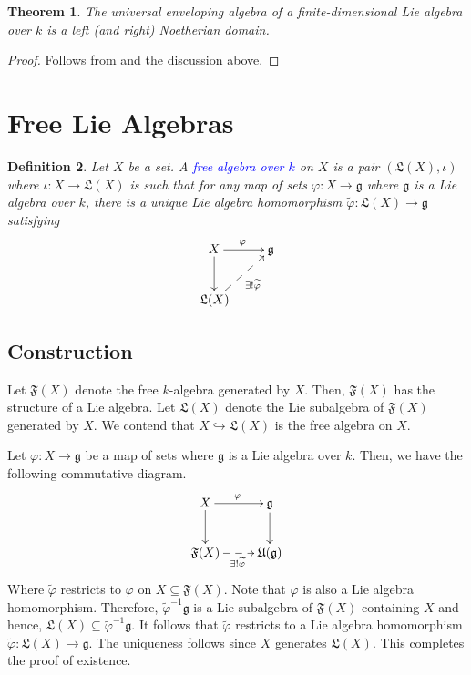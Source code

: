 \documentclass[12pt]{article}
\theoremstyle{thmstyle}
\newtheorem{theorem}{Theorem}[section]
\theoremstyle{defstyle}
\newtheorem{definition}[theorem]{Definition}
\newcommand{\frakF}{\mathfrak{F}}
\newcommand{\frakg}{\mathfrak{g}}
\newcommand{\frakL}{\mathfrak{L}}
\newcommand{\frakU}{\mathfrak{U}}
\newcommand{\wt}[1]{\widetilde{#1}}
\newcommand{\into}{\hookrightarrow}
\newcommand{\define}[1]{\textcolor{blue}{\textit{#1}}}
\begin{document}
\begin{theorem}
    The universal enveloping algebra of a finite-dimensional Lie algebra over $k$ is a left (and right) Noetherian domain.
\end{theorem}
\begin{proof}
    Follows from  and the discussion above.
\end{proof}

\section{Free Lie Algebras}

\begin{definition}
    Let $X$ be a set. A \define{free algebra over $k$} on $X$ is a pair $(\frakL(X), \iota)$ where $\iota: X\to\frakL(X)$ is such that for any map of sets $\varphi: X\to\frakg$ where $\frakg$ is a Lie algebra over $k$, there is a unique Lie algebra homomorphism $\wt\varphi:\frakL(X)\to\frakg$ satisfying 
    \begin{equation*}
        \xymatrix {
            X\ar[r]^{\varphi}\ar[d] & \frakg\\
            \frakL(X)\ar@{-->}[ru]_{\exists!\wt\varphi}
        }
    \end{equation*}
\end{definition}

\subsection{Construction}

Let $\mathfrak F(X)$ denote the free $k$-algebra generated by $X$. Then, $\frakF(X)$ has the structure of a Lie algebra. Let $\frakL(X)$ denote the Lie subalgebra of $\frakF(X)$ generated by $X$. We contend that $X\into\frakL(X)$ is the free algebra on $X$.

Let $\varphi: X\to\frakg$ be a map of sets where $\frakg$ is a Lie algebra over $k$. Then, we have the following commutative diagram. 
\begin{equation*}
    \xymatrix {
        X\ar[r]^\varphi\ar[d] & \frakg\ar[d]\\
        \frakF(X)\ar@{-->}[r]_{\exists!\wt\varphi} & \frakU(\frakg)
    }
\end{equation*}
Where $\wt\varphi$ restricts to $\varphi$ on $X\subseteq\frakF(X)$. Note that $\varphi$ is also a Lie algebra homomorphism. Therefore, $\wt\varphi^{-1}\frakg$ is a Lie subalgebra of $\frakF(X)$ containing $X$ and hence, $\frakL(X)\subseteq\wt\varphi^{-1}\frakg$. It follows that $\wt\varphi$ restricts to a Lie algebra homomorphism $\wt\varphi: \frakL(X)\to\frakg$. The uniqueness follows since $X$ generates $\frakL(X)$. This completes the proof of existence. 
\end{document}
